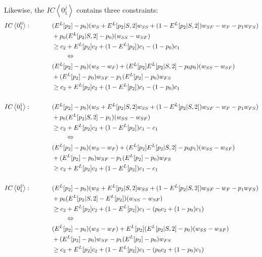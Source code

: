 \documentclass[11pt]{article} %
\theoremstyle{exampstyle}
\newcommand{\eq}[1]{\begin{align}#1\end{align}}
\newcommand{\la}{ \left < }
\newcommand{\ra}{ \right > }
\begin{document}
Likewise, the $IC\la 0^j_1 \ra$ contains three constraints:
\eq{
IC\la0^0_1\ra: \hspace{.5in} &(E^L[p_2] -p_0)(w_S+E^L[p_2|S,2]w_{SS}+(1-E^L[p_2|S,2])w_{SF} -w_F-p_1w_{FS}) \notag \\
&+p_0(E^L[p_2|S,2]-p_0 )(w_{SS}-w_{SF})  \notag \\
& \ge c_2+E^L[p_2]c_2+(1-E^L[p_2])c_1-(1-p_0)c_1 \notag \\
& \hspace{.3in} \Leftrightarrow \notag \\ 
& (E^L[p_2]-p_0)(w_S-w_F) + (E^L[p_2] E^L[p_2 | S,2] - p_0 p_0 ) (w_{SS} -w_{SF}) \notag \\
& + (E^L[p_2] - p_0 ) w_{SF} - p_1 (E^L[p_2] - p_0) w_{FS}\notag \\
& \ge c_2 + E^L[p_2] c_2 + (1-E^L[p_2]) c_1 - (1-p_0) c_1 \notag \\
\notag 
\\
IC\la0^1_1\ra: \hspace{.5in}  &(E^L[p_2] -p_0)(w_S+E^L[p_2|S,2]w_{SS}+(1-E^L[p_2|S,2])w_{SF} -w_F-p_1w_{FS}) \notag \\
&+p_0(E^L[p_2|S,2]-p_1 )(w_{SS}-w_{SF})  \notag \\
& \ge c_2+E^L[p_2]c_2+(1-E^L[p_2])c_1-c_1 \notag \\
& \hspace{.3in} \Leftrightarrow \notag \\
& (E^L[p_2]-p_0)(w_S-w_F) + (E^L[p_2] E^L[p_2 | S,2] - p_0 p_1 ) (w_{SS} -w_{SF}) \notag \\
& + (E^L[p_2] - p_0 ) w_{SF} - p_1 (E^L[p_2] - p_0) w_{FS} \notag \\
& \ge c_2 + E^L[p_2] c_2 + (1-E^L[p_2]) c_1 - c_1 \notag \\
\notag 
\\
IC\la0^2_1\ra: \hspace{.5in}  &(E^L[p_2] -p_0)(w_S+E^L[p_2|S,2]w_{SS}+(1-E^L[p_2|S,2])w_{SF} -w_F-p_1w_{FS}) \notag \\
&+p_0(E^L[p_2|S,2]-E^L[p_2])(w_{SS}-w_{SF})  \notag \\
& \ge c_2+E^L[p_2]c_2+(1-E^L[p_2])c_1-(p_0c_2+(1-p_0)c_1) \notag \\
& \hspace{.3in} \Leftrightarrow \notag \\
& (E^L[p_2]-p_0)(w_S-w_F) + E^L[p_2] (E^L[p_2 | S,2] - p_0) (w_{SS} -w_{SF}) \notag \\
& + (E^L[p_2] - p_0 ) w_{SF} - p_1 (E^L[p_2] - p_0) w_{FS} \notag \\
& \ge c_2 + E^L[p_2] c_2 + (1-E^L[p_2]) c_1- ( p_0 c_2 + (1-p_0) c_1 )\notag 
}
\end{document}
